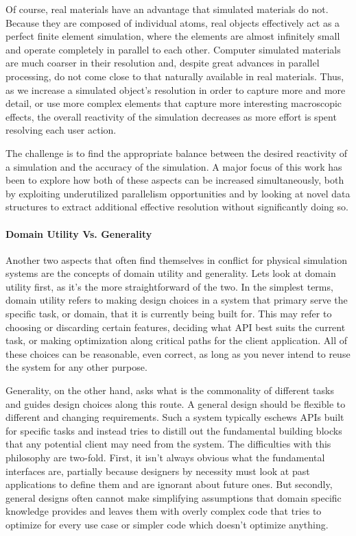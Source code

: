 Of course, real materials have an advantage that simulated materials
do not. Because they are composed of individual atoms, real objects
effectively act as a perfect finite element simulation, where the
elements are almost infinitely small and operate completely in
parallel to each other. Computer simulated materials are much coarser
in their resolution and, despite great advances in parallel
processing, do not come close to that naturally available in real
materials. Thus, as we increase a simulated object's resolution in
order to capture more and more detail, or use more complex elements
that capture more interesting macroscopic effects, the overall
reactivity of the simulation decreases as more effort is spent
resolving each user action.

The challenge is to find the appropriate balance between the desired
reactivity of a simulation and the accuracy of the simulation. A major
focus of this work has been to explore how both of these aspects can be
increased simultaneously, both by exploiting underutilized parallelism
opportunities and by looking at novel data structures to extract
additional effective resolution without significantly doing so.
  
\paragraph{Domain Utility Vs. Generality}

Another two aspects that often find themselves in conflict for
physical simulation systems are the concepts of domain utility and
generality. Lets look at domain utility first, as it's the more
straightforward of the two. In the simplest terms, domain utility
refers to making design choices in a system that primary serve the
specific task, or domain, that it is currently being built for. This
may refer to choosing or discarding certain features, deciding what
API best suits the current task, or making optimization along critical
paths for the client application. All of these choices can be
reasonable, even correct, as long as you never intend to reuse the
system for any other purpose.

Generality, on the other hand, asks what is the commonality of
different tasks and guides design choices along this route. A general
design should be flexible to different and changing requirements. Such
a system typically eschews APIs built for specific tasks and instead
tries to distill out the fundamental building blocks that any
potential client may need from the system. The difficulties with this
philosophy are two-fold. First, it isn't always obvious what the
fundamental interfaces are, partially because designers by necessity
must look at past applications to define them and are ignorant about
future ones. But secondly, general designs often cannot make
simplifying assumptions that domain specific knowledge provides and
leaves them with overly complex code that tries to optimize for every
use case or simpler code which doesn't optimize anything.

